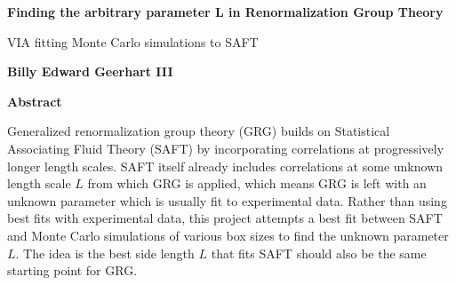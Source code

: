 \thispagestyle{plain}
\begin{center}
	\Large
	\textbf{Finding the arbitrary parameter L in Renormalization Group Theory}
	
	\vspace{0.4cm}
	\large
	VIA fitting Monte Carlo simulations to SAFT
	
	\vspace{0.4cm}
	\textbf{Billy Edward Geerhart III}
	
	\vspace{0.9cm}
	\textbf{Abstract}
\end{center}
Generalized renormalization group theory (GRG) builds on Statistical Associating Fluid Theory (SAFT) by incorporating correlations at progressively longer length scales. SAFT itself already includes correlations at some unknown length scale $L$ from which GRG is applied, which means GRG is left with an unknown parameter which is usually fit to experimental data. Rather than using best fits with experimental data, this project attempts a best fit between SAFT and Monte Carlo simulations of various box sizes to find the unknown parameter $L$. The idea is the best side length $L$ that fits SAFT should also be the same starting point for GRG.


